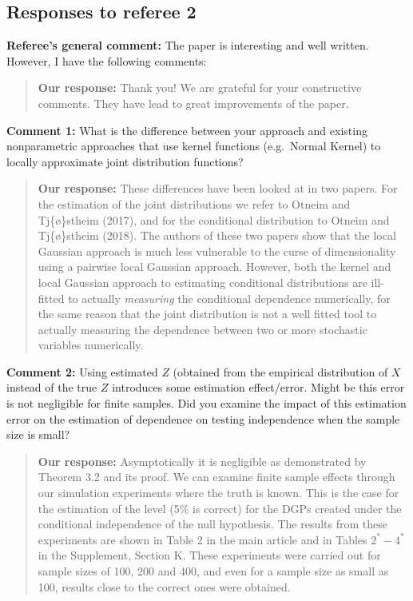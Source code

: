 \documentclass[
  12pt,
  letterpaper]{article}
\numberwithin{equation}{section}
\begin{document}
\hypertarget{responses-to-referee-2}{%
\subsection{Responses to referee 2}\label{responses-to-referee-2}}

\textbf{Referee's general comment:} The paper is interesting and well written. However, I have the following comments:

\begin{quote}
\textbf{Our response:} Thank you! We are grateful for your constructive comments. They have lead to great improvements of the paper.
\end{quote}

\textbf{Comment 1:} What is the difference between your approach and existing nonparametric approaches that use kernel functions (e.g.~Normal Kernel) to locally approximate joint distribution functions?

\begin{quote}
\textbf{Our response:} These differences have been looked at in two papers. For the estimation of the joint distributions we refer to Otneim and Tj\{\o\}stheim (2017), and for the conditional distribution to Otneim and Tj\{\o\}stheim (2018). The authors of these two papers show that the local Gaussian approach is much less vulnerable to the curse of dimensionality using a pairwise local Gaussian approach. However, both the kernel and local Gaussian approach to estimating conditional distributions are ill-fitted to actually \emph{measuring} the conditional dependence numerically, for the same reason that the joint distribution is not a well fitted tool to actually measuring the dependence between two or more stochastic variables numerically.
\end{quote}

\textbf{Comment 2:} Using estimated \(Z\) (obtained from the empirical distribution of \(X\) instead of the true \(Z\) introduces some estimation effect/error. Might be this error is not negligible for finite samples. Did you examine the impact of this estimation error on the estimation of dependence on testing independence when the sample size is small?

\begin{quote}
\textbf{Our response:} Asymptotically it is negligible as demonstrated by Theorem 3.2 and its proof. We can examine finite sample effects through our simulation experiments where the truth is known. This is the case for the estimation of the level (5\% is correct) for the DGPs created under the conditional independence of the null hypothesis. The results from these experiments are shown in Table 2 in the main article and in Tables \(2^* - 4^*\) in the Supplement, Section K. These experiments were carried out for sample sizes of 100, 200 and 400, and even for a sample size as small as 100, results close to the correct ones were obtained.
\end{quote}
\end{document}
